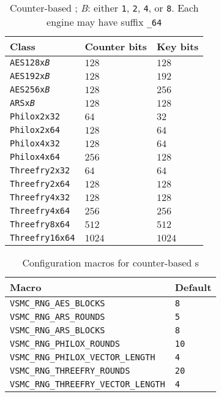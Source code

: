 \begin{table}
  \def\B{\textcolor{MRed}{\textit{B}}}
  \def\V{\textcolor{MRed}{\textit{V}}}
  \begin{tabularx}{\textwidth}{Xll}
    \toprule
    Class & Counter bits & Key bits \\
    \midrule
    \texttt{AES128x\B}     & $128$  & $128$  \\
    \texttt{AES192x\B}     & $128$  & $192$  \\
    \texttt{AES256x\B}     & $128$  & $256$  \\
    \texttt{ARSx\B}        & $128$  & $128$  \\
    \texttt{Philox2x32}    & $64$   & $32$   \\
    \texttt{Philox2x64}    & $128$  & $64$   \\
    \texttt{Philox4x32}    & $128$  & $64$   \\
    \texttt{Philox4x64}    & $256$  & $128$  \\
    \texttt{Threefry2x32}  & $64$   & $64$   \\
    \texttt{Threefry2x64}  & $128$  & $128$  \\
    \texttt{Threefry4x32}  & $128$  & $128$  \\
    \texttt{Threefry4x64}  & $256$  & $256$  \\
    \texttt{Threefry8x64}  & $512$  & $512$  \\
    \texttt{Threefry16x64} & $1024$ & $1024$ \\
    \bottomrule
  \end{tabularx}
  \caption{Counter-based \rng; \B: either \texttt{1}, \texttt{2}, \texttt{4},
    or \texttt{8}. Each \rng engine may have suffix \texttt{\_64}}
  \label{tab:Counter-based RNG}
\end{table}

\begin{table}
  \begin{tabularx}{\textwidth}{XX}
    \toprule
    Macro & Default \\
    \midrule
    \verb|VSMC_RNG_AES_BLOCKS|             & \verb|8|  \\
    \verb|VSMC_RNG_ARS_ROUNDS|             & \verb|5|  \\
    \verb|VSMC_RNG_ARS_BLOCKS|             & \verb|8|  \\
    \verb|VSMC_RNG_PHILOX_ROUNDS|          & \verb|10| \\
    \verb|VSMC_RNG_PHILOX_VECTOR_LENGTH|   & \verb|4|  \\
    \verb|VSMC_RNG_THREEFRY_ROUNDS|        & \verb|20| \\
    \verb|VSMC_RNG_THREEFRY_VECTOR_LENGTH| & \verb|4|  \\
    \bottomrule
  \end{tabularx}
  \caption{Configuration macros for counter-based \rng{}s}
  \label{tab:Configuration macros for counter-based RNGs}
\end{table}

